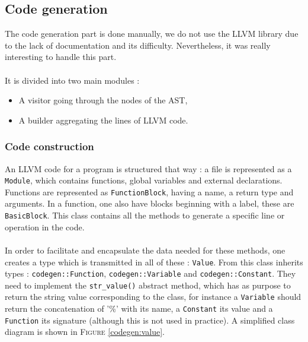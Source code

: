 \documentclass[a4paper,11pt]{article}
\begin{document}
\subsection{Code generation}

The code generation part is done manually, we do not use the LLVM library due to the lack of documentation and its difficulty. Nevertheless, it was really interesting to handle this part. 

\paragraph{}

It is divided into two main modules : 
\begin{itemize}
	\item A visitor going through the nodes of the AST,
	\item A builder aggregating the lines of LLVM code.
\end{itemize}

	\subsubsection{Code construction}

An LLVM code for a program is structured that way : a file is represented as a \texttt{Module}, which contains functions, global variables and external declarations. Functions are represented as \texttt{FunctionBlock}, having a name, a return type and arguments. In a function, one also have blocks beginning with a label, these are \texttt{BasicBlock}. This class contains all the methods to generate a specific line or operation in the code. 

\paragraph{}

In order to facilitate and encapsulate the data needed for these methods, one creates a type which is transmitted in all of these : \texttt{Value}. From this class inherits types : \texttt{codegen::Function}, \texttt{codegen::Variable} and \texttt{codegen::Constant}. They need to implement the \texttt{str\_value()} abstract method, which has as purpose to return the string value corresponding to the class, for instance a \texttt{Variable} should return the concatenation of '\%' with its name, a \texttt{Constant} its value and a \texttt{Function} its signature (although this is not used in practice). A simplified class diagram is shown in \textsc{Figure} \ref{codegen:value}.
\end{document}
